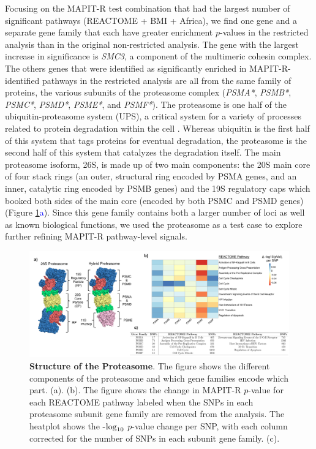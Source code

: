 \documentclass[12pt,a4paper]{article}
\def\log{{\rm log}}
\begin{document}
Focusing on the MAPIT-R test combination that had the largest number of significant pathways (REACTOME + BMI + Africa), we find one gene and a separate gene family that each have greater enrichment $p$-values in the restricted analysis than in the original non-restricted analysis. The gene with the largest increase in significance is {\emph{SMC3}}, a component of the multimeric cohesin complex. The others genes that were identified as significantly enriched in MAPIT-R-identified pathways in the restricted analysis are all from the same family of proteins, the various subunits of the proteasome complex ({\emph{PSMA*}}, {\emph{PSMB*}}, {\emph{PSMC*}}, {\emph{PSMD*}}, {\emph{PSME*}}, and {\emph{PSMF*}}). The proteasome is one half of the ubiquitin-proteasome system (UPS), a critical system for a variety of processes related to protein degradation within the cell \citep{Voges1999,Livneh2016,Collins2017}. Whereas ubiquitin is the first half of this system that tags proteins for eventual degradation, the proteasome is the second half of this system that catalyzes the degradation itself. The main proteasome isoform, 26S, is made up of two main components: the 20S main core of four stack rings (an outer, structural ring encoded by PSMA genes, and an inner, catalytic ring encoded by PSMB genes) and the 19S regulatory caps which booked both sides of the main core (encoded by both PSMC and PSMD genes) (Figure \ref{InterPath-Main-Figure-Proteasome-Panels}\textcolor{blue}{a}). Since this gene family contains both a larger number of loci as well as known biological functions, we used the proteasome as a test case to explore further refining MAPIT-R pathway-level signals.

\begin{figure}[htbp]
\centering
\hspace*{-2.5cm}
\includegraphics[scale=.55]{Images/Main/InterPath_Main_Figure_Proteasome_vs2.png}
\caption[TBD]{\textbf{Structure of the Proteasome}. The figure shows the different components of the proteasome and which gene families encode which part. (a). (b). The figure shows the change in MAPIT-R $p$-value for each REACTOME pathway labeled when the SNPs in each proteasome subunit gene family are removed from the analysis. The heatplot shows the -$\log_{10}$ $p$-value change per SNP, with each column corrected for the number of SNPs in each subunit gene family. (c).
}
\label{InterPath-Main-Figure-Proteasome-Panels}
\end{figure}
\end{document}
